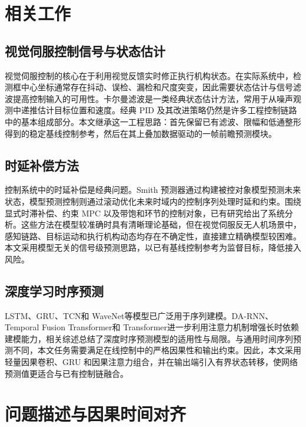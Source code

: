 \documentclass[journal]{IEEEtran}
\begin{document}
\section{相关工作}

\subsection{视觉伺服控制信号与状态估计}
视觉伺服控制的核心在于利用视觉反馈实时修正执行机构状态\cite{chaumette2006visual,hutchinson1996tutorial}。在实际系统中，检测框中心坐标通常存在抖动、误检、漏检和尺度突变，因此需要状态估计与信号滤波提高控制输入的可用性。卡尔曼滤波\cite{kalman1960new,welch1995introduction}是一类经典状态估计方法，常用于从噪声观测中递推估计目标位置和速度。经典 PID 及其改进策略仍然是许多工程控制链路中的基本组成部分\cite{liu2003advancedpid}。本文继承这一工程思路：首先保留已有滤波、限幅和低通整形得到的稳定基线控制参考，然后在其上叠加数据驱动的一帧前瞻预测模块。

\subsection{时延补偿方法}
控制系统中的时延补偿是经典问题。Smith 预测器\cite{smith1957closer}通过构建被控对象模型预测未来状态，模型预测控制\cite{camacho2013model}则通过滚动优化未来时域内的控制序列处理时延和约束。围绕显式时滞补偿、约束 MPC 以及带饱和环节的控制对象，已有研究给出了系统分析\cite{normey2009taking,xi2013mpc_cn,li2006saturatedmpc_cn,chen2007timedelaympc_cn}。这些方法在模型较准确时具有清晰理论基础，但在视觉伺服反无人机场景中，感知链路、目标运动和执行机构动态均存在不确定性，直接建立精确模型较困难。本文采用模型无关的信号级预测思路，以已有基线控制参考为监督目标，降低接入风险。

\subsection{深度学习时序预测}
LSTM\cite{hochreiter1997long}、GRU\cite{cho2014learning}、TCN\cite{bai2018empirical}和 WaveNet\cite{oord2016wavenet}等模型已广泛用于序列建模。DA-RNN\cite{qin2017darnn}、Temporal Fusion Transformer\cite{lim2021tft}和 Transformer\cite{vaswani2017attention}进一步利用注意力机制增强长时依赖建模能力，相关综述总结了深度时序预测模型的适用性与局限\cite{wen2023transformers}。与通用时间序列预测不同，本文任务需要满足在线控制中的严格因果性和输出约束。因此，本文采用轻量因果卷积、GRU 和因果注意力组合，并在输出端引入有界状态转移，使网络预测值更适合与已有控制链融合。

\section{问题描述与因果时间对齐}
\end{document}
